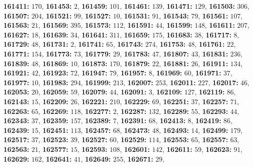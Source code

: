 \textsf{\bfseries 161411:} $170$, \textsf{\bfseries 161453:} $2$, \textsf{\bfseries 161459:} $101$, \textsf{\bfseries 161461:} $139$, \textsf{\bfseries 161471:} $129$, \textsf{\bfseries 161503:} $306$, \textsf{\bfseries 161507:} $204$, \textsf{\bfseries 161521:} $99$, \textsf{\bfseries 161527:} $10$, \textsf{\bfseries 161531:} $91$, \textsf{\bfseries 161543:} $79$, \textsf{\bfseries 161561:} $107$, \textsf{\bfseries 161563:} $21$, \textsf{\bfseries 161569:} $395$, \textsf{\bfseries 161573:} $112$, \textsf{\bfseries 161591:} $44$, \textsf{\bfseries 161599:} $148$, \textsf{\bfseries 161611:} $207$, \textsf{\bfseries 161627:} $18$, \textsf{\bfseries 161639:} $34$, \textsf{\bfseries 161641:} $311$, \textsf{\bfseries 161659:} $175$, \textsf{\bfseries 161683:} $38$, \textsf{\bfseries 161717:} $8$, \textsf{\bfseries 161729:} $48$, \textsf{\bfseries 161731:} $2$, \textsf{\bfseries 161741:} $65$, \textsf{\bfseries 161743:} $274$, \textsf{\bfseries 161753:} $48$, \textsf{\bfseries 161761:} $22$, \textsf{\bfseries 161771:} $154$, \textsf{\bfseries 161773:} $73$, \textsf{\bfseries 161779:} $29$, \textsf{\bfseries 161783:} $47$, \textsf{\bfseries 161807:} $43$, \textsf{\bfseries 161831:} $236$, \textsf{\bfseries 161839:} $48$, \textsf{\bfseries 161869:} $10$, \textsf{\bfseries 161873:} $170$, \textsf{\bfseries 161879:} $22$, \textsf{\bfseries 161881:} $26$, \textsf{\bfseries 161911:} $134$, \textsf{\bfseries 161921:} $42$, \textsf{\bfseries 161923:} $72$, \textsf{\bfseries 161947:} $79$, \textsf{\bfseries 161957:} $8$, \textsf{\bfseries 161969:} $60$, \textsf{\bfseries 161971:} $37$, \textsf{\bfseries 161977:} $10$, \textsf{\bfseries 161983:} $294$, \textsf{\bfseries 161999:} $213$, \textsf{\bfseries 162007:} $253$, \textsf{\bfseries 162011:} $227$, \textsf{\bfseries 162017:} $46$, \textsf{\bfseries 162053:} $20$, \textsf{\bfseries 162059:} $59$, \textsf{\bfseries 162079:} $44$, \textsf{\bfseries 162091:} $3$, \textsf{\bfseries 162109:} $127$, \textsf{\bfseries 162119:} $86$, \textsf{\bfseries 162143:} $15$, \textsf{\bfseries 162209:} $26$, \textsf{\bfseries 162221:} $210$, \textsf{\bfseries 162229:} $69$, \textsf{\bfseries 162251:} $37$, \textsf{\bfseries 162257:} $71$, \textsf{\bfseries 162263:} $65$, \textsf{\bfseries 162269:} $118$, \textsf{\bfseries 162277:} $2$, \textsf{\bfseries 162287:} $132$, \textsf{\bfseries 162289:} $55$, \textsf{\bfseries 162293:} $44$, \textsf{\bfseries 162343:} $37$, \textsf{\bfseries 162359:} $157$, \textsf{\bfseries 162389:} $7$, \textsf{\bfseries 162391:} $68$, \textsf{\bfseries 162413:} $8$, \textsf{\bfseries 162419:} $86$, \textsf{\bfseries 162439:} $15$, \textsf{\bfseries 162451:} $113$, \textsf{\bfseries 162457:} $68$, \textsf{\bfseries 162473:} $48$, \textsf{\bfseries 162493:} $14$, \textsf{\bfseries 162499:} $179$, \textsf{\bfseries 162517:} $37$, \textsf{\bfseries 162523:} $39$, \textsf{\bfseries 162527:} $60$, \textsf{\bfseries 162529:} $114$, \textsf{\bfseries 162553:} $65$, \textsf{\bfseries 162557:} $63$, \textsf{\bfseries 162563:} $21$, \textsf{\bfseries 162577:} $15$, \textsf{\bfseries 162593:} $108$, \textsf{\bfseries 162601:} $142$, \textsf{\bfseries 162611:} $59$, \textsf{\bfseries 162623:} $91$, \textsf{\bfseries 162629:} $162$, \textsf{\bfseries 162641:} $41$, \textsf{\bfseries 162649:} $255$, \textsf{\bfseries 162671:} $29$, 
